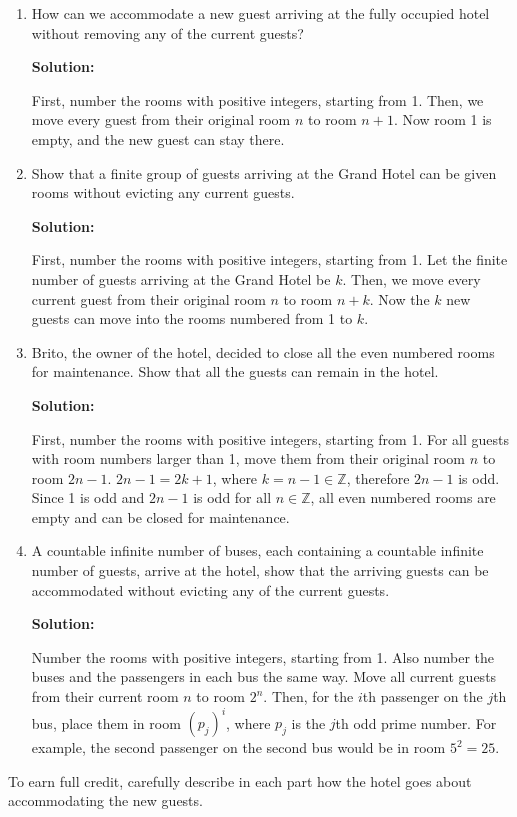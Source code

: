\documentclass{article}
\newenvironment{solution}
{
\medskip
\par
\color{blue}
\textbf{Solution:}
}
{
\medskip
\par
}
\begin{document}
\begin{enumerate}
\begin{enumerate}
    \item  How can we accommodate a new guest arriving at the fully occupied hotel without removing any of the current guests?
     \begin{solution}
        First, number the rooms with positive integers, starting from 1. Then, we move every guest from their original room $n$ to room $n + 1$. Now room 1 is empty, and the new guest can stay there.
    \end{solution}
    \item Show that a finite group of guests arriving at the Grand Hotel can be given rooms without evicting any current guests.
     \begin{solution}
        First, number the rooms with positive integers, starting from 1. Let the finite number of guests arriving at the Grand Hotel be $k$. Then, we move every current guest from their original room $n$ to room $n + k$. Now the $k$ new guests can move into the rooms numbered from 1 to $k$.
    \end{solution}
    \item Brito, the owner of the hotel, decided to close all the even numbered rooms for maintenance. Show that all the guests can remain in the hotel.
     \begin{solution}
        First, number the rooms with positive integers, starting from 1. For all guests with room numbers larger than 1, move them from their original room $n$ to room $2n - 1$. $2n - 1 = 2k + 1$, where $k = n - 1 \in \mathbb{Z}$, therefore $2n - 1$ is odd. Since 1 is odd and $2n - 1$ is odd for all $n \in \mathbb{Z}$, all even numbered rooms are empty and can be closed for maintenance.
    \end{solution}
    \item A countable infinite number of buses, each containing a countable infinite number of guests, arrive at the hotel, show that the arriving guests can be accommodated without evicting any of the current guests.
    \begin{solution}
        Number the rooms with positive integers, starting from 1. Also number the buses and the passengers in each bus the same way. Move all current guests from their current room $n$ to room $2^n$. Then, for the $i$th passenger on the $j$th bus, place them in room $(p_j)^i$, where $p_j$ is the $j$th odd prime number. For example, the second passenger on the second bus would be in room $5^2 = 25$.
    \end{solution}
    \end{enumerate}

To earn full credit, carefully describe in each part how the hotel goes about accommodating the new guests.

\end{enumerate}
\end{document}
